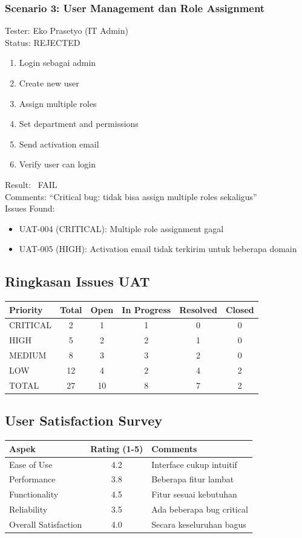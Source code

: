 \documentclass[12pt,a4paper]{article}
\newcommand{\xmark}{\ding{55}}
\begin{document}
\subsubsection{Scenario 3: User Management dan Role Assignment}
Tester: Eko Prasetyo (IT Admin) \\
Status: REJECTED
\begin{enumerate}
  \item Login sebagai admin
  \item Create new user
  \item Assign multiple roles
  \item Set department and permissions
  \item Send activation email
  \item Verify user can login
\end{enumerate}
Result: \xmark\ FAIL \\
Comments: ``Critical bug: tidak bisa assign multiple roles sekaligus'' \\
Issues Found:
\begin{itemize}
  \item UAT-004 (CRITICAL): Multiple role assignment gagal
  \item UAT-005 (HIGH): Activation email tidak terkirim untuk beberapa domain
\end{itemize}

\subsection{Ringkasan Issues UAT}
\begin{tabularx}{\textwidth}{@{}lccccc@{}}
\toprule
Priority & Total & Open & In Progress & Resolved & Closed \\
\midrule
CRITICAL & 2 & 1 & 1 & 0 & 0 \\
HIGH & 5 & 2 & 2 & 1 & 0 \\
MEDIUM & 8 & 3 & 3 & 2 & 0 \\
LOW & 12 & 4 & 2 & 4 & 2 \\
TOTAL & 27 & 10 & 8 & 7 & 2 \\
\bottomrule
\end{tabularx}

\subsection{User Satisfaction Survey}
\begin{tabularx}{\textwidth}{@{}lcl@{}}
\toprule
Aspek & Rating (1-5) & Comments \\
\midrule
Ease of Use & 4.2 & Interface cukup intuitif \\
Performance & 3.8 & Beberapa fitur lambat \\
Functionality & 4.5 & Fitur sesuai kebutuhan \\
Reliability & 3.5 & Ada beberapa bug critical \\
Overall Satisfaction & 4.0 & Secara keseluruhan bagus \\
\bottomrule
\end{tabularx}
\end{document}
